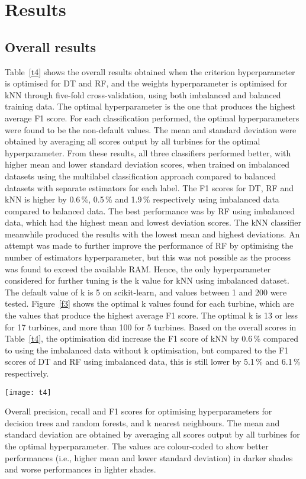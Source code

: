 
\chapter{Results}\label{c3}

\section{Overall results}

Table~\ref{t4} shows the overall results obtained when the criterion hyperparameter is optimised for DT and RF, and the weights hyperparameter is optimised for kNN through five-fold cross-validation, using both imbalanced and balanced training data. The optimal hyperparameter is the one that produces the highest average F1 score. For each classification performed, the optimal hyperparameters were found to be the non-default values. The mean and standard deviation were obtained by averaging all scores output by all turbines for the optimal hyperparameter. From these results, all three classifiers performed better, with higher mean and lower standard deviation scores, when trained on imbalanced datasets using the multilabel classification approach compared to balanced datasets with separate estimators for each label. The F1 scores for DT, RF and kNN is higher by 0.6\,\%, 0.5\,\% and 1.9\,\% respectively using imbalanced data compared to balanced data. The best performance was by RF using imbalanced data, which had the highest mean and lowest deviation scores. The kNN classifier meanwhile produced the results with the lowest mean and highest deviations. An attempt was made to further improve the performance of RF by optimising the number of estimators hyperparameter, but this was not possible as the process was found to exceed the available RAM. Hence, the only hyperparameter considered for further tuning is the k value for kNN using imbalanced dataset. The default value of k is 5 on scikit-learn, and values between 1 and 200 were tested. Figure~\ref{f3} shows the optimal k values found for each turbine, which are the values that produce the highest average F1 score. The optimal k is 13 or less for 17 turbines, and more than 100 for 5 turbines. Based on the overall scores in Table~\ref{t4}, the optimisation did increase the F1 score of kNN by 0.6\,\% compared to using the imbalanced data without k optimisation, but compared to the F1 scores of DT and RF using imbalanced data, this is still lower by 5.1\,\% and 6.1\,\% respectively.

\begin{table}
    \centering
    \texttt{[image: t4]}
    \caption{\label{t4}Overall precision, recall and F1 scores for optimising hyperparameters for decision trees and random forests, and k nearest neighbours. The mean and standard deviation are obtained by averaging all scores output by all turbines for the optimal hyperparameter. The values are colour-coded to show better performances (i.e., higher mean and lower standard deviation) in darker shades and worse performances in lighter shades.}
\end{table}

